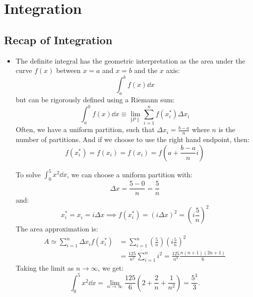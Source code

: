 \section{Integration}
\subsection{Recap of Integration}
\begin{itemize}
    \item The definite integral has the geometric interpretation as the area under the curve $f(x)$ between $x=a$ and $x=b$ and the $x$ axis:
    \begin{equation}
        \int_a^b f(x) \dd{x}
    \end{equation}
    but can be rigorously defined using a Riemann sum:
    \begin{equation}
        \int_a^b f(x) \dd{x} \equiv \lim_{\Vert P \rVert} \sum_{i=1}^n f(x_i^*)\Delta x_i
        \label{eq:}
    \end{equation}
    Often, we have a uniform partition, such that $\Delta x_i = \frac{b-a}{n}$ where $n$ is the number of partitions. And if we choose to use the right hand endpoint, then:
    \begin{equation}
        f(x_i^*) = f(x_i) = f(x_i) = f\left(a+\frac{b-a}{n}i\right)
    \end{equation}
    \begin{example}
        To solve $\int_0^5 x^2 \dd{x}$, we can choose a uniform partition with:
        \begin{equation}
            \Delta x = \frac{5-0}{n} = \frac{5}{n}
        \end{equation}
        and:
        \begin{equation}
            x_i^* = x_i = i\Delta x \implies f(x_i^*)=(i\Delta x)^2 = \left(i\frac{5}{n}\right)^2
        \end{equation}
        The area approximation is:
        \begin{align}
            A \simeq \sum_{i=1}^n \Delta x_i f(x_i^*) &= \sum_{i=1}^n \left(\frac{5}{n}\right)\left(i\frac{5}{n}\right)^2 \\ 
            &= \frac{125}{n^2} \sum_{i=1}^n i^2 = \frac{125}{n^3} \frac{n(n+1)(2n+1)}{6}
        \end{align}
        Taking the limit as $n\to \infty$, we get:
        \begin{equation}
            \int_0^5 x^2 \dd{x} =  \lim_{n\to\infty} \frac{125}{6}\left(2+\frac{2}{n}+\frac{1}{n^2}\right) = \frac{5^3}{3}.

\end{equation}
\end{example}
\end{itemize}
